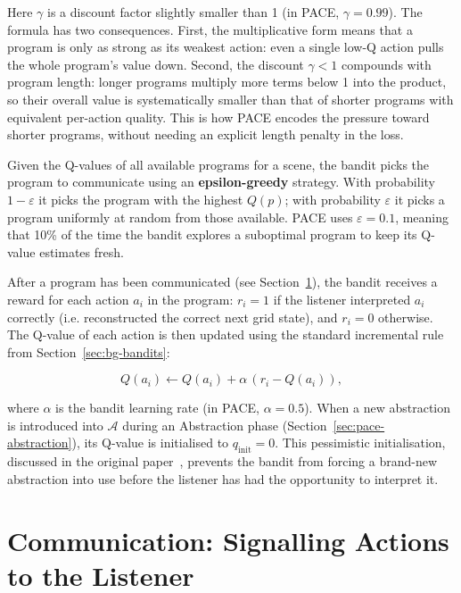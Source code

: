 Here $\gamma$ is a discount factor slightly smaller than 1 (in PACE, $\gamma = 0.99$). The formula has two consequences. First, the multiplicative form means that a program is only as strong as its weakest action: even a single low-Q action pulls the whole program's value down. Second, the discount $\gamma < 1$ compounds with program length: longer programs multiply more terms below 1 into the product, so their overall value is systematically smaller than that of shorter programs with equivalent per-action quality. This is how PACE encodes the pressure toward shorter programs, without needing an explicit length penalty in the loss.

Given the Q-values of all available programs for a scene, the bandit picks the program to communicate using an \textbf{epsilon-greedy} strategy. With probability $1 - \varepsilon$ it picks the program with the highest $Q(p)$; with probability $\varepsilon$ it picks a program uniformly at random from those available. PACE uses $\varepsilon = 0.1$, meaning that 10\% of the time the bandit explores a suboptimal program to keep its Q-value estimates fresh.

After a program has been communicated (see Section~\ref{sec:pace-communication}), the bandit receives a reward for each action $a_i$ in the program: $r_i = 1$ if the listener interpreted $a_i$ correctly (i.e. reconstructed the correct next grid state), and $r_i = 0$ otherwise. The Q-value of each action is then updated using the standard incremental rule from Section~\ref{sec:bg-bandits}:

\begin{equation}
    Q(a_i) \leftarrow Q(a_i) + \alpha \, (r_i - Q(a_i)),
    \label{eq:pace-q-update}
\end{equation}

where $\alpha$ is the bandit learning rate (in PACE, $\alpha = 0.5$). When a new abstraction is introduced into $\mathcal{A}$ during an Abstraction phase (Section~\ref{sec:pace-abstraction}), its Q-value is initialised to $q_{\text{init}} = 0$. This pessimistic initialisation, discussed in the original paper~\cite{thomas_pace_2025}, prevents the bandit from forcing a brand-new abstraction into use before the listener has had the opportunity to interpret it.

\section{Communication: Signalling Actions to the Listener}
\label{sec:pace-communication}

